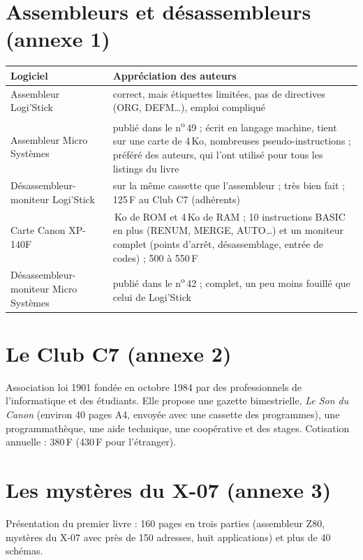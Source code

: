 \documentclass[a4paper,10pt]{article}
\begin{document}
\section{Assembleurs et désassembleurs (annexe 1)}
\begin{center}\small
\begin{tabular}{@{}>{\raggedright}p{4.2cm}>{\raggedright\arraybackslash}p{12.3cm}@{}}
\toprule
Logiciel & Appréciation des auteurs \\
\midrule
Assembleur Logi'Stick & correct, mais étiquettes limitées, pas de directives (ORG, DEFM\dots), emploi compliqué \\
Assembleur Micro Systèmes & publié dans le n\textsuperscript{o}\,49 ; écrit en langage machine, tient sur une carte de 4\,Ko, nombreuses pseudo-instructions ; préféré des auteurs, qui l'ont utilisé pour tous les listings du livre \\
Désassembleur-moniteur Logi'Stick & sur la même cassette que l'assembleur ; très bien fait ; 125\,F au Club C7 (adhérents) \\
Carte Canon XP-140F & 8\,Ko de ROM et 4\,Ko de RAM ; 10 instructions BASIC en plus (RENUM, MERGE, AUTO\dots) et un moniteur complet (points d'arrêt, désassemblage, entrée de codes) ; 500 à 550\,F \\
Désassembleur-moniteur Micro Systèmes & publié dans le n\textsuperscript{o}\,42 ; complet, un peu moins fouillé que celui de Logi'Stick \\
\bottomrule
\end{tabular}
\end{center}

\section{Le Club C7 (annexe 2)}
Association loi 1901 fondée en octobre 1984 par des professionnels de
l'informatique et des étudiants. Elle propose une gazette bimestrielle,
\emph{Le Son du Canon} (environ 40 pages A4, envoyée avec une cassette des
programmes), une programmathèque, une aide technique, une coopérative et des
stages. Cotisation annuelle : 380\,F (430\,F pour l'étranger).

\section{Les mystères du X-07 (annexe 3)}
Présentation du premier livre : 160 pages en trois parties (assembleur Z80,
mystères du X-07 avec près de 150 adresses, huit applications) et plus de
40 schémas.
\end{document}
